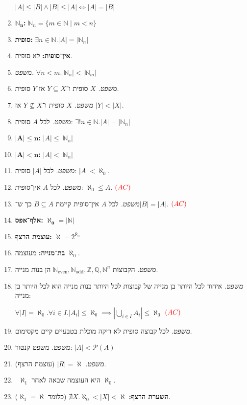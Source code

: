 \documentclass[]{article}
\newcommand\N     {\mathbb{N}}
\newcommand\Z     {\mathbb{Z}}
\newcommand\Q     {\mathbb{Q}}
\newcommand\ps    {\mathcal{P}}
\newcommand\Neven {\N_{\mathrm{even}}}
\newcommand\Nodd  {\N_{\mathrm{odd }}}
\newcommand\az    {\aleph_0}
\newcommand\al    {\aleph}
\newcommand\taz   {2^{\aleph_0}}
\newcommand\sof[1]    {\left | #1 \right |}
\newcommand\ax[1]     {\color{blue}#1\color{black}}
\newcommand\tho       {\textit{משפט. }}
\newcommand\ac        {$\color{red}(AC)\color{black}$}
\begin{document}
\begin{multicols}{2}
\begin{enumerate}[resume]
				\hfill $ |A| \le |B| \land |B| \le |A| \iff |A| = |B| $
			\item \textbf{$\bm{\N_n}$: }\hfill $\N_n = \{m \in \N \mid m < n\}$
			\item \textbf{סופית: }\hfill $\exists n \in \N. |A| = |\N_n|$
			\item \textbf{אין־סופית: }לא סופית. 
			\item \tho \hfill $\forall n < m. |\N_n| < |\N_m|$
			\item \tho $X$ סופית ו־$Y \subseteq X$ אז $Y$ סופית. 
			\item \tho $X$ סופית ו־$Y \nsubseteq X$ אז $|Y| < |X|$. 
			\item \tho לכל $A$ סופית: \hfill $\exists! n \in \N. |A| = |\N_n|$
			\item \textbf{$\bm{|A| \le n}$: }\hfill $|A| \le |\N_n|$
			\item \textbf{$\bm{|A| < n}$: }\hfill $|A| < |\N_n|$
			\item \tho לכל $|A|$ סופית: \hfill $|A| < \az$. 
			\item \tho לכל $A$ אין־סופית: \hfill $\az \le A$. \ac
			\item \tho לכל $A$ אין־סופית קיימת $B \subseteq A$ כך ש־$|B| = |A|$. \hfill \ac
			\item \textbf{אלף־אפס: }\hfill $\bm{\az} = |\N|$
			\item \textbf{עוצמת הרצף: }\hfill $\bm{\al} = \taz$
			\item \textbf{בת־מנייה: }מעוצמה $\az$. 
			\item \tho הקבוצות $\Neven, \Nodd, \Z, \Q, \N^{n}$ הן בנות מנייה. 
			\item \tho איחוד לכל היותר בן מנייה של קבוצות לכל היותר בנות מנייה הוא לכל היותר בן מנייה: 
				
				\hfill $ \forall |I| = \az. \forall i \in I. |A_i| \le \az \implies \sof{\bigcup_{i \in I}A_i} \le \az $ \ac
			\item \tho לכל קבוצה סופית לא ריקה מוכלת בטבעיים קיים מקסימום. 
			\item \tho משפט קנטור: $|A| < \ps(A)$
			\item \tho $|R| = \al$ (עוצמת הרצף). 
			\item \ \!\![לא בחומר] $\aleph_1$ היא העוצמה שבאה לאחר $\az$. 
			\item \ax{\textbf{השערת הרצף: }}$\nexists X. \az < |X| < \al$ (כלומר $\aleph_1 = \al$). 
		\end{enumerate}

\end{multicols}
\end{document}

